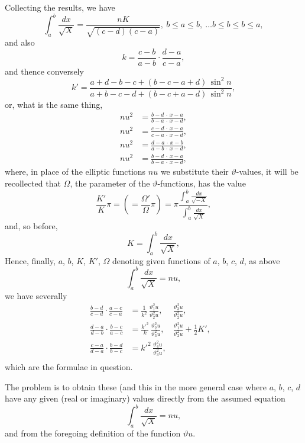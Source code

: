 \documentclass[12pt,a4paper,oneside]{book}
\theoremstyle{plain}
\theoremstyle{definition}
\theoremstyle{remark}
\begin{document}
Collecting the results, we have
\[
\int_a^b\frac{dx}{\sqrt{X}}=\frac{nK}{\sqrt{(c-d)(c-a)}}, \ b\le a\le b,\ \dots b\le b\le b\le a,
\]
and also
\[
k=\frac{c-b}{a-b}\cdot\frac{d-a}{c-a},
\]
and thence conversely
\[
k'=\frac{a+d-b-c+(b-c-a+d)\,\sin^2 n}{a+b-c-d+(b-c+a-d)\,\sin^2 n},
\]
or, what is the same thing,
\begin{align*}
nu^2&=\frac{b-d\,\cdot\,x-a}{b-a\,\cdot\,x-d},\\
nu^2&=\frac{c-d\,\cdot\,x-a}{c-a\,\cdot\,x-d},\\
nu^2&=\frac{d-a\,\cdot\,x-b}{a-b\,\cdot\,x-d},\\
nu^2&=\frac{b-d\,\cdot\,x-a}{b-a\,\cdot\,x-d},
\end{align*}
where, in place of the elliptic functions $nu$ we substitute their $\vartheta$-values, it will be recollected that $\Omega$, the parameter of the $\vartheta$-functions, has the value
\[
\frac{K'}{K}\pi=\left(=\frac{\Omega'}{\Omega}\pi\right)=\pi\frac{\int_a^b\frac{dx}{\sqrt{-X}}}{\int_a^b\frac{dx}{\sqrt{X}}},
\]
and, so before,
\[
K=\int_a^b\frac{dx}{\sqrt{X}},
\]
Hence, finally, $a$, $b$, $K$, $K'$, $\Omega$ denoting given functions of $a$, $b$, $c$, $d$, as above
\[
\int_a^b\frac{dx}{\sqrt{X}}=nu,
\]
we have severally
\begin{align*}
\frac{b-d}{c-d}\cdot\frac{a-c}{c-a}&=\frac{1}{k^2}\,\frac{\vartheta_1^2 u}{\vartheta_2^2 u},&\frac{\vartheta_3^2 u}{\vartheta_2^2 u},&\\
\frac{d-a}{d-b}\cdot\frac{b-c}{a-c}&=\frac{k'^2}{k}\,\frac{\vartheta_2^2 u}{\vartheta_3^2 u},& \frac{\vartheta_1^2 u}{\vartheta_2^2 u}+\tfrac{1}{2}K',\\
\frac{c-a}{d-a}\cdot\frac{b-d}{b-c}&=k'^2\,\frac{\vartheta_4^2 u}{\vartheta_3^2 u},&\\
\end{align*}
which are the formulae in question.

\newpage
The problem is to obtain these (and this in the more general case where $a$, $b$, $c$, $d$ have any given (real or imaginary) values directly from the assumed equation
\[
\int_a^b\frac{dx}{\sqrt{X}}=nu,
\]
and from the foregoing definition of the function $\vartheta u$.
\end{document}
